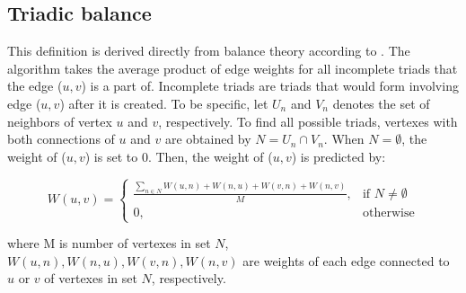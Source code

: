 \subsection{Triadic balance}
This definition is derived directly from
balance theory according to \cite{TB}. The algorithm takes the average product of edge weights for all incomplete triads
that the edge ($u,v$) is a part of. Incomplete triads are triads that would form involving
edge ($u,v$) after it is created. To be specific, let $U_n$ and $V_n$ denotes the set of
neighbors of vertex $u$ and $v$, respectively. To find all possible triads, vertexes with
both connections of $u$ and $v$ are obtained by $N = U_n \cap V_n$. When $N = \emptyset$, 
the weight of ($u,v$) is set to 0. Then, the weight of ($u,v$)
is predicted by:

\begin{equation}
W(u,v) = 
\begin{cases}
\frac{\sum_{n\in N}W(u,n)+W(n,u)+W(v,n)+W(n,v)}{M}, & \text{if $N \neq \emptyset$} \\
0, & \text{otherwise}
\end{cases}
\end{equation}

where M is number of vertexes in set $N$, $W(u,n), W(n,u), W(v,n), W(n,v)$ are weights of each edge connected
to $u$ or $v$ of vertexes in set $N$, respectively.